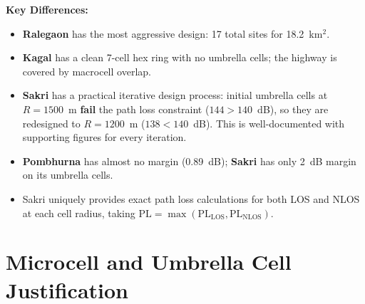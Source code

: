 \documentclass[11pt,a4paper]{article}
\begin{document}
\noindent\textbf{Key Differences:}
\begin{itemize}
    \item \textbf{Ralegaon} has the most aggressive design: 17 total sites for 18.2~km$^2$.
    \item \textbf{Kagal} has a clean 7-cell hex ring with no umbrella cells; the highway is covered by macrocell overlap.
    \item \textbf{Sakri} has a practical iterative design process: initial umbrella cells at $R = 1500$~m \textbf{fail} the path loss constraint ($144 > 140$~dB), so they are redesigned to $R = 1200$~m ($138 < 140$~dB). This is well-documented with supporting figures for every iteration.
    \item \textbf{Pombhurna} has almost no margin (0.89~dB); \textbf{Sakri} has only 2~dB margin on its umbrella cells.
    \item Sakri uniquely provides exact path loss calculations for both LOS and NLOS at each cell radius, taking $\text{PL} = \max(\text{PL}_{\text{LOS}}, \text{PL}_{\text{NLOS}})$.
\end{itemize}

\section{Microcell and Umbrella Cell Justification}
\label{sec:special}
\end{document}
